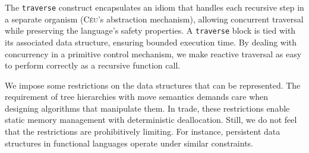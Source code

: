 \documentclass{sig-alternate}
\newcommand{\CEU}{\textsc{C\'{e}u}\xspace}
\newcommand{\code}[1] {{\small{\texttt{#1}}}}
\begin{document}
The \code{traverse} construct encapsulates an idiom that handles each recursive 
step in a separate organism (\CEU's abstraction mechanism), allowing concurrent 
traversal while preserving the language's safety properties.
A \code{traverse} block is tied with its associated data structure, ensuring 
bounded execution time. %
By dealing with concurrency in a primitive control mechanism, we make reactive 
traversal as easy to perform correctly as a recursive function call.
%

%
We impose some restrictions on the data structures that can be represented.
The requirement of tree hierarchies with move semantics 
demands care when designing algorithms that manipulate them.
In trade, these restrictions enable static memory management with
deterministic deallocation.
Still, we do not feel that the restrictions are prohibitively limiting.
For instance, persistent data structures in functional languages operate under 
similar constraints.

\balance



\balancecolumns
\end{document}

